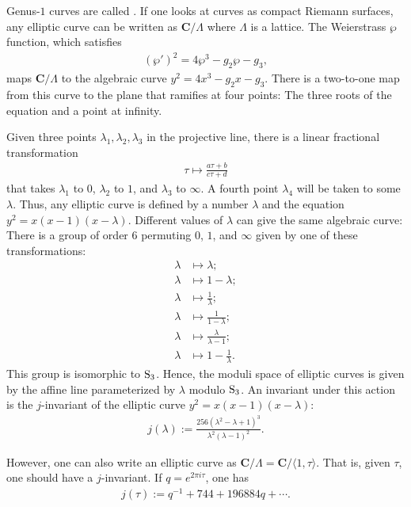 \documentclass [11 pt, oneside] {article}
\begin{document}
Genus-$1$ curves are called . If one looks at curves as compact Riemann surfaces, any elliptic curve can be written as $\mathbf{C}/\Lambda$ where $\Lambda$ is a lattice. The Weierstrass $\wp$ function, which satisfies
\begin{align*}
	(\wp') ^2 = 4\wp^3 -g_2\wp-g_3,
\end{align*}
maps $\mathbf{C}/\Lambda$ to the algebraic curve $y^2=4x^3-g_2x-g_3$. There is a two-to-one map from this curve to the plane that ramifies at four points: The three roots of the equation and a point at infinity.

Given three points $\lambda_1,\lambda_2,\lambda_3$ in the projective line, there is a linear fractional transformation 
\begin{align*}
	\tau\longmapsto \frac{a\tau+b}{c\tau+d}
\end{align*}
that takes $\lambda_1$ to $0$, $\lambda_2$ to $1$, and $\lambda_3$ to $\infty$. A fourth point $\lambda_4$ will be taken to some $\lambda$. Thus, any elliptic curve is defined by a number $\lambda$ and the equation $y^2=x(x-1) (x-\lambda)$. Different values of $\lambda$ can give the same algebraic curve: There is a group of order $6$ permuting $0$, $1$, and $\infty$ given by one of these transformations:
\begin{align*}
	\lambda&\longmapsto\lambda;\\
	\lambda&\longmapsto 1-\lambda;\\
	\lambda&\longmapsto\frac{1}{\lambda};\\
	\lambda&\longmapsto \frac{1}{1-\lambda};\\
	\lambda&\longmapsto \frac{\lambda}{\lambda-1};\\
	\lambda&\longmapsto 1-\frac{1}{\lambda}.
\end{align*}
This group is isomorphic to $\operatorname{S}_3$. Hence, the moduli space of elliptic curves is given by the affine line parameterized by $\lambda$ modulo $\operatorname{S}_3$. An invariant under this action is the $j$-invariant of the elliptic curve $y^2 = x(x-1) (x-\lambda)$:
\begin{align*}
	j(\lambda) := \frac{256(\lambda^2-\lambda+1)^3}{\lambda^2(\lambda-1)^2}.
\end{align*}

However, one can also write an elliptic curve as $\mathbf{C}/\Lambda=\mathbf{C}/\langle 1,\tau\rangle$. That is, given $\tau$, one should have a $j$-invariant. If $q=e^{2\pi i\tau}$, one has
\begin{align*}
	j(\tau) := q ^{-1} + 744 + 196884q + \cdots.
\end{align*}
\end{document}
